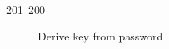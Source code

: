 201~200~\documentclass{article}
\begin{document}
\begin{figure}[h]
	                                                                                                                                                                                                                                                                                                	                                                                                                                                        	    	                                                                                                	                                                                                                                                                                                                                                                                                                                                	                                                                        	                                                                        	                                                                \caption{Derive key from password}
	                                                                                                                                                                                                                                                                                                	                                                                                                                                        	    	                                                                                                	                                                                                                                                                                                                                                                                                                                                	                                                                        	                                                                        	                                                                    \label{fig:enter-label}
	                                                                                                                                                                                                                                                                                                	                                                                                                                                        	    	                                                                                                	                                                                                                                                                                                                                                                                                                                                	                                                                        	                                                                        	                                                                    \end{figure}
\end{document}

